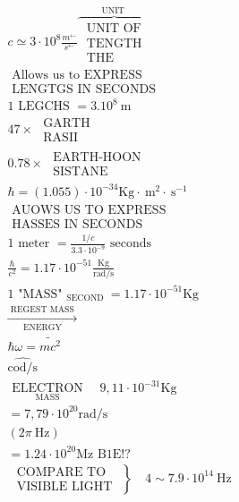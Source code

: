 \documentclass[10pt]{article}
\begin{document}
$$
\begin{aligned}
& c \simeq 3 \cdot 10^{8} \frac{m^{\leftarrow}}{s^{\leftarrow}} \overbrace{\substack{\text { UNIT OF } \\
\text { TENGTH } \\
\text { THE }}}^{\text {UNIT }} \\
& \text { Allows us to EXPRESS } \\
& \text { LENGTGS IN SECONDS } \\
& 1 \text { LEGCHS }=3.10^{8} \mathrm{~m} \\
& 47 \times \begin{array}{c}
\text { GARTH } \\
\text { RASII }
\end{array} \\
& 0.78 \times \begin{array}{c}
\text { EARTH-HOON } \\
\text { SISTANE }
\end{array} \\
& \hbar=(1.055) \cdot 10^{-34} \mathrm{Kg} \cdot \mathrm{~m}^{2} \cdot \mathrm{~s}^{-1} \\
& \text { AUOWS US TO EXPRESS } \\
& \text { HASSES IN SECONDS } \\
& 1 \text { meter }=\frac{1 / c}{3.3 \cdot 10^{-9}} \text { seconds } \\
& \frac{\hbar}{c^{2}}=1.17 \cdot 10^{-51} \frac{\mathrm{Kg}}{\mathrm{rad} / \mathrm{s}} \\
& 1 \text { "MASS" }_{\text {SECOND }}=1.17 \cdot 10^{-51} \mathrm{Kg} \\
& \xrightarrow[\text { ENERGY }]{\text { REGEST MASS }} \\
& \hbar \omega=\widetilde{m c^{2}} \\
& \hat{\mathrm{cod} / \mathrm{s}} \\
& \underset{\text { MASS }}{\text { ELECTRON }} \quad 9,11 \cdot 10^{-31} \mathrm{Kg} \\
& =7,79 \cdot 10^{20} \mathrm{rad} / \mathrm{s} \\
& (2 \pi \mathrm{~Hz}) \\
& =1.24 \cdot 10^{20} \mathrm{Mz} \text { B1E!? } \\
& \left.\begin{array}{l}
\text { COMPARE TO } \\
\text { VISIBLE LIGHT }
\end{array}\right\} \quad 4 \sim 7.9 \cdot 10^{14} \mathrm{~Hz}
\end{aligned}
$$
\end{document}
